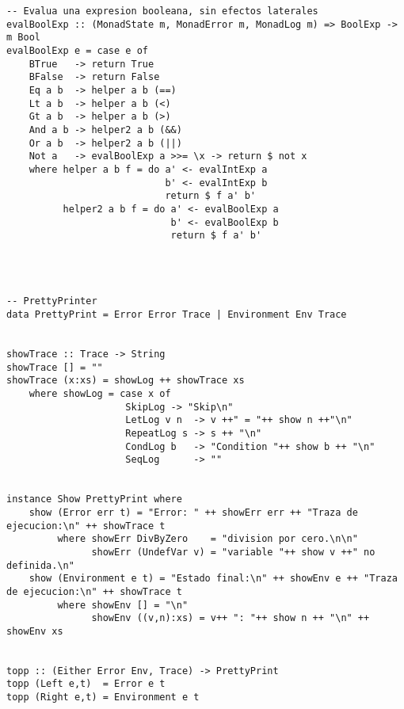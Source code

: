 \documentclass[a4paper]{report}
\begin{document}
\begin{lstlisting}
-- Evalua una expresion booleana, sin efectos laterales
evalBoolExp :: (MonadState m, MonadError m, MonadLog m) => BoolExp -> m Bool
evalBoolExp e = case e of
    BTrue   -> return True
    BFalse  -> return False
    Eq a b  -> helper a b (==)
    Lt a b  -> helper a b (<)
    Gt a b  -> helper a b (>)
    And a b -> helper2 a b (&&)
    Or a b  -> helper2 a b (||)
    Not a   -> evalBoolExp a >>= \x -> return $ not x
    where helper a b f = do a' <- evalIntExp a
                            b' <- evalIntExp b
                            return $ f a' b'
          helper2 a b f = do a' <- evalBoolExp a
                             b' <- evalBoolExp b
                             return $ f a' b'




-- PrettyPrinter
data PrettyPrint = Error Error Trace | Environment Env Trace


showTrace :: Trace -> String
showTrace [] = ""
showTrace (x:xs) = showLog ++ showTrace xs
    where showLog = case x of
                     SkipLog -> "Skip\n"
                     LetLog v n  -> v ++" = "++ show n ++"\n"
                     RepeatLog s -> s ++ "\n"
                     CondLog b   -> "Condition "++ show b ++ "\n"
                     SeqLog      -> ""


instance Show PrettyPrint where
    show (Error err t) = "Error: " ++ showErr err ++ "Traza de ejecucion:\n" ++ showTrace t
         where showErr DivByZero    = "division por cero.\n\n"
               showErr (UndefVar v) = "variable "++ show v ++" no definida.\n"
    show (Environment e t) = "Estado final:\n" ++ showEnv e ++ "Traza de ejecucion:\n" ++ showTrace t
         where showEnv [] = "\n"
               showEnv ((v,n):xs) = v++ ": "++ show n ++ "\n" ++ showEnv xs


topp :: (Either Error Env, Trace) -> PrettyPrint
topp (Left e,t)  = Error e t
topp (Right e,t) = Environment e t

\end{lstlisting}
\end{document}

